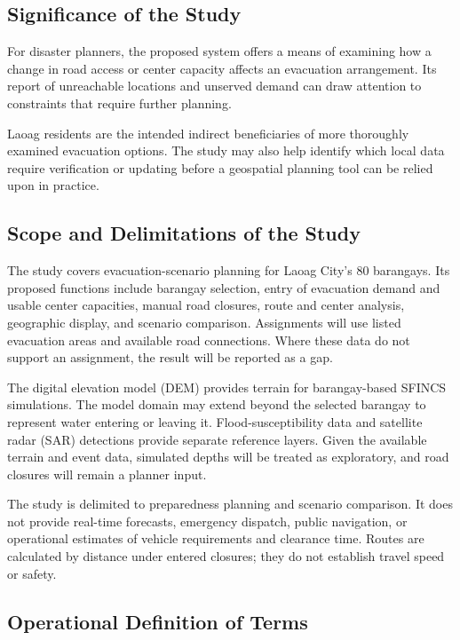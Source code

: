 \subsection{Significance of the Study}

For disaster planners, the proposed system offers a means of examining how a change in road access or center capacity affects an evacuation arrangement. Its report of unreachable locations and unserved demand can draw attention to constraints that require further planning.

Laoag residents are the intended indirect beneficiaries of more thoroughly examined evacuation options. The study may also help identify which local data require verification or updating before a geospatial planning tool can be relied upon in practice.

\subsection{Scope and Delimitations of the Study}

The study covers evacuation-scenario planning for Laoag City's 80 barangays. Its proposed functions include barangay selection, entry of evacuation demand and usable center capacities, manual road closures, route and center analysis, geographic display, and scenario comparison. Assignments will use listed evacuation areas and available road connections. Where these data do not support an assignment, the result will be reported as a gap.

The digital elevation model (DEM) provides terrain for barangay-based SFINCS simulations. The model domain may extend beyond the selected barangay to represent water entering or leaving it. Flood-susceptibility data and satellite radar (SAR) detections provide separate reference layers. Given the available terrain and event data, simulated depths will be treated as exploratory, and road closures will remain a planner input.

The study is delimited to preparedness planning and scenario comparison. It does not provide real-time forecasts, emergency dispatch, public navigation, or operational estimates of vehicle requirements and clearance time. Routes are calculated by distance under entered closures; they do not establish travel speed or safety.

\subsection{Operational Definition of Terms}


